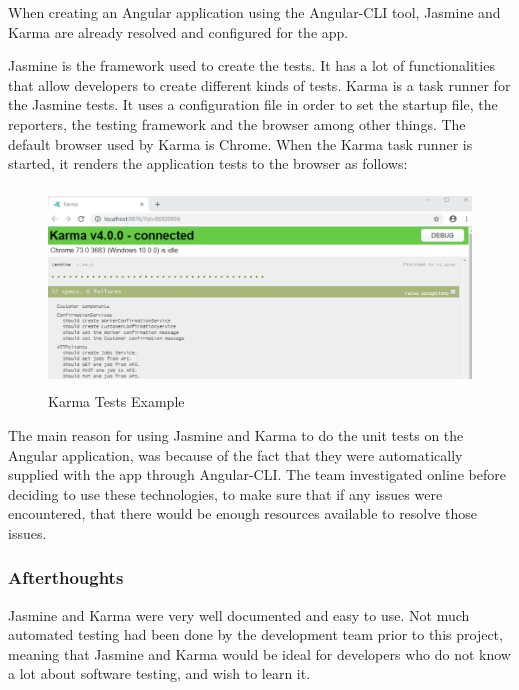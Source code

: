 \bigskip

When creating an Angular application using the Angular-CLI tool, Jasmine and Karma are already resolved and configured for the app.

Jasmine is the framework used to create the tests. It has a lot of functionalities that allow developers to create different kinds of tests.
Karma is a task runner for the Jasmine tests. It uses a configuration file in order to set the startup file, the reporters, the testing framework and the browser among other things.
The default browser used by Karma is Chrome. When the Karma task runner is started, it renders the application tests to the browser as follows:

\begin{figure}[H]
    \centering
    \includegraphics[width=\textwidth, height=150pt]{img/Karma2.PNG}
    \caption{Karma Tests Example}
    \label{fig:my_label}
\end{figure}


\bigskip

The main reason for using Jasmine and Karma to do the unit tests on the Angular application, was because of the fact that they were automatically supplied with the app through Angular-CLI. The team investigated online before deciding to use these technologies, to make sure that if any issues were encountered, that there would be enough resources available to resolve those issues. 

\bigskip

\subsubsection{Afterthoughts}

Jasmine and Karma were very well documented and easy to use. Not much automated testing had been done by the development team prior to this project, meaning that Jasmine and Karma would be ideal for developers who do not know a lot about software testing, and wish to learn it.
